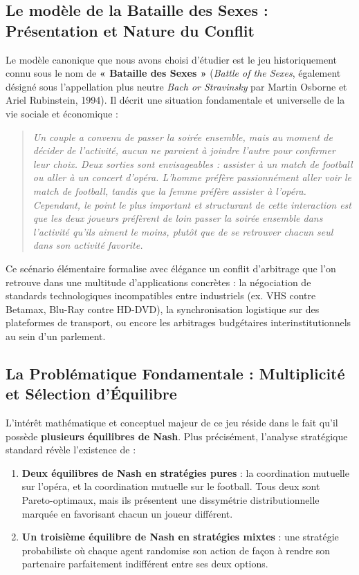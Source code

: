 \documentclass[11pt,a4paper]{article}
\begin{document}
\subsection*{Le modèle de la Bataille des Sexes : Présentation et Nature du Conflit}
Le modèle canonique que nous avons choisi d'étudier est le jeu historiquement connu sous le nom de \textbf{« Bataille des Sexes »} (\emph{Battle of the Sexes}, également désigné sous l'appellation plus neutre \emph{Bach or Stravinsky} par Martin Osborne et Ariel Rubinstein, 1994). Il décrit une situation fondamentale et universelle de la vie sociale et économique :
\begin{quote}
\textit{Un couple a convenu de passer la soirée ensemble, mais au moment de décider de l'activité, aucun ne parvient à joindre l'autre pour confirmer leur choix. Deux sorties sont envisageables : assister à un match de football ou aller à un concert d'opéra. L'homme préfère passionnément aller voir le match de football, tandis que la femme préfère assister à l'opéra. Cependant, le point le plus important et structurant de cette interaction est que les deux joueurs préfèrent de loin passer la soirée ensemble dans l'activité qu'ils aiment le moins, plutôt que de se retrouver chacun seul dans son activité favorite.}
\end{quote}

Ce scénario élémentaire formalise avec élégance un conflit d'arbitrage que l'on retrouve dans une multitude d'applications concrètes : la négociation de standards technologiques incompatibles entre industriels (ex. VHS contre Betamax, Blu-Ray contre HD-DVD), la synchronisation logistique sur des plateformes de transport, ou encore les arbitrages budgétaires interinstitutionnels au sein d'un parlement. 

\subsection*{La Problématique Fondamentale : Multiplicité et Sélection d'Équilibre}
L'intérêt mathématique et conceptuel majeur de ce jeu réside dans le fait qu'il possède \textbf{plusieurs équilibres de Nash}. Plus précisément, l'analyse stratégique standard révèle l'existence de :
\begin{enumerate}[label=(\arabic*)]
    \item \textbf{Deux équilibres de Nash en stratégies pures} : la coordination mutuelle sur l'opéra, et la coordination mutuelle sur le football. Tous deux sont Pareto-optimaux, mais ils présentent une dissymétrie distributionnelle marquée en favorisant chacun un joueur différent.
    \item \textbf{Un troisième équilibre de Nash en stratégies mixtes} : une stratégie probabiliste où chaque agent randomise son action de façon à rendre son partenaire parfaitement indifférent entre ses deux options.
\end{enumerate}
\end{document}
